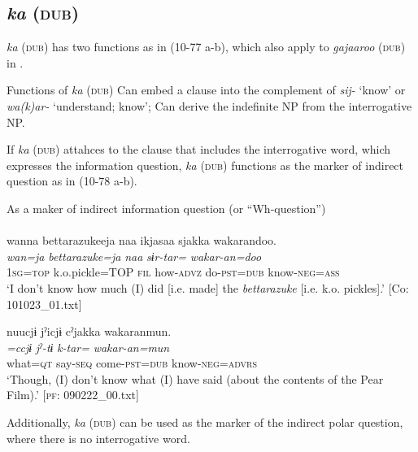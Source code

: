 \subsection{\textit{ka} (\textsc{dub})}\label{sec:10.4.2}

\textit{ka} (\textsc{dub}) has two functions as in (10-77 a-b), which also apply to \textit{gajaaroo} (\textsc{dub}) in .

\ea\label{ex:10.77} Functions of \textit{ka} (\textsc{dub})
 \ea Can embed a clause into the complement of \textit{sij-} ‘know’ or \textit{wa(k)ar-} ‘understand; know’;
 \ex Can derive the indefinite NP from the interrogative NP.
 \z
\z

If \textit{ka} (\textsc{dub}) attahces to the clause that includes the interrogative word, which expresses the information question, \textit{ka} (\textsc{dub}) functions as the marker of indirect question as in (10-78 a-b).

\ea\label{ex:10.78}   As a maker of indirect information question (or “Wh-question”)\\
  \ea\relax  [= (5-38 a)]\\
      \glll    wanna  {\textbar}bettarazukee{\textbar}ja  naa  ikjasaa  sjakka  wakarandoo.\\
      \textit{wan=ja}  \textit{bettarazuke=ja}  \textit{naa}  \textit{}  \textit{sɨr-tar=}  \textit{wakar-an=doo}\\
      1\textsc{sg}=\textsc{top}  k.o.pickle=TOP  \textsc{fil}  how-\textsc{advz}  do-\textsc{pst}=\textsc{dub}  know-\textsc{neg}=\textsc{ass}\\
      \glt       ‘I don’t know how much (I) did [i.e. made] the \textit{bettarazuke} [i.e. k.o. pickles].’ [Co: 101023\_01.txt]

  \ex %
      \glll    nuucjɨ  jˀicjɨ  cˀjakka  wakaranmun.\\
      \textit{=ccjɨ}  \textit{jˀ-tɨ}  \textit{k-tar=}  \textit{wakar-an=mun}\\
      what=\textsc{qt}  say-\textsc{seq}  come-\textsc{pst}=\textsc{dub}  know-\textsc{neg}=\textsc{advrs}\\
      \glt       ‘Though, (I) don’t know what (I) have said (about the contents of the Pear Film).’ [\textsc{pf}: 090222\_00.txt]
    \z
\z

Additionally, \textit{ka} (\textsc{dub}) can be used as the marker of the indirect polar question, where there is no interrogative word.


